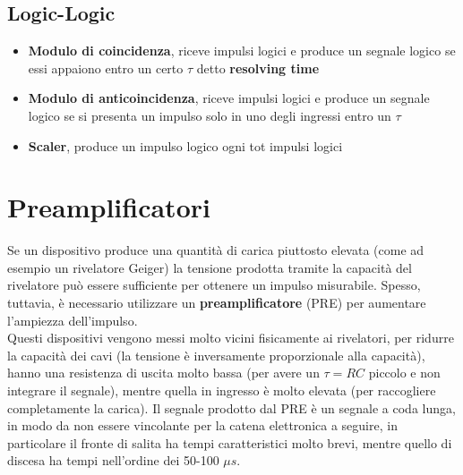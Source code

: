 \subsection{Logic-Logic}
\begin{itemize}
\item \textbf{Modulo di coincidenza}, riceve impulsi logici e produce un segnale logico se essi appaiono entro un certo $\tau$ detto \textbf{resolving time}
\item \textbf{Modulo di anticoincidenza}, riceve impulsi logici e produce un segnale logico se si presenta un impulso solo in uno degli ingressi entro un $\tau$
\item \textbf{Scaler}, produce un impulso logico ogni tot impulsi logici
\end{itemize}

\section{Preamplificatori}
Se un dispositivo produce una quantit\`a di carica piuttosto elevata (come ad esempio un rivelatore Geiger) la tensione prodotta tramite la capacit\`a del rivelatore
pu\`o essere sufficiente per ottenere un impulso misurabile.
Spesso, tuttavia, \`e necessario utilizzare un \textbf{preamplificatore} (PRE) per aumentare l'ampiezza dell'impulso.\\
Questi dispositivi vengono messi molto vicini fisicamente ai rivelatori, per ridurre la capacit\`a dei cavi (la tensione \`e inversamente proporzionale alla capacit\`a),
hanno una resistenza di uscita molto bassa (per avere un $\tau = RC$ piccolo e non integrare il segnale), mentre quella in ingresso \`e molto elevata (per raccogliere completamente la carica).
Il segnale prodotto dal PRE \`e un segnale a coda lunga, in modo da non essere vincolante per la catena elettronica a seguire, in particolare il fronte di salita ha
tempi caratteristici molto brevi, mentre quello di discesa ha tempi nell'ordine dei 50-100 $\mu s$.\\
